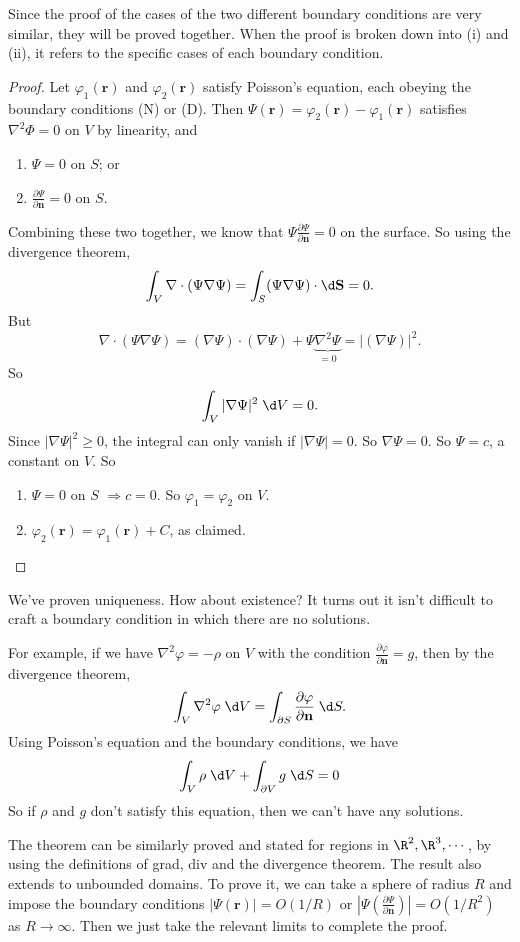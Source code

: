 \documentclass[a4paper]{article}
\begin{document}
Since the proof of the cases of the two different boundary conditions are very similar, they will be proved together. When the proof is broken down into (i) and (ii), it refers to the specific cases of each boundary condition.
\begin{proof}
  Let $\varphi_1(\mathbf{r})$ and $\varphi_2(\mathbf{r})$ satisfy Poisson's equation, each obeying the boundary conditions (N) or (D). Then $\Psi(\mathbf{r}) = \varphi_2(\mathbf{r}) - \varphi_1(\mathbf{r})$ satisfies $\nabla^2\Phi = 0$ on $V$ by linearity, and
  \begin{enumerate}
    \item $\Psi = 0$ on $S$; or
    \item $\frac{\partial \Psi}{\partial \mathbf{n}} = 0$ on $S$.
  \end{enumerate}
  Combining these two together, we know that $\Psi\frac{\partial \Psi}{\partial \mathbf{n}} = 0$ on the surface. So using the divergence theorem,
  \[
    \int_V \nabla\cdot (\Psi\nabla \Psi) = \int_S (\Psi\nabla\Psi)\cdot \d \mathbf{S} = 0.
  \]
  But
  \[
    \nabla\cdot(\Psi\nabla \Psi) = (\nabla\Psi)\cdot (\nabla\Psi) + \Psi\underbrace{\nabla^2\Psi}_{=0} = |(\nabla\Psi)|^2.
  \]
  So
  \[
    \int_V |\nabla \Psi|^2\;\d V = 0.
  \]
  Since $|\nabla\Psi|^2 \geq 0$, the integral can only vanish if $|\nabla \Psi| = 0$. So $\nabla\Psi = 0$. So $\Psi = c$, a constant on $V$. So
  \begin{enumerate}
    \item $\Psi = 0$ on $S$ $\Rightarrow c = 0$. So $\varphi_1 = \varphi_2$ on $V$.
    \item $\varphi_2(\mathbf{r}) = \varphi_1(\mathbf{r}) + C$, as claimed.
  \end{enumerate}
\end{proof}
We've proven uniqueness. How about existence? It turns out it isn't difficult to craft a boundary condition in which there are no solutions.

For example, if we have $\nabla^2 \varphi = -\rho$ on $V$ with the condition $\frac{\partial \varphi}{\partial \mathbf{n}} = g$, then by the divergence theorem,
\[
  \int_V \nabla^2\varphi \;\d V = \int_{\partial S} \frac{\partial \varphi}{\partial \mathbf{n}}\;\d S.
\]
Using Poisson's equation and the boundary conditions, we have
\[
  \int_V \rho \;\d V + \int_{\partial V} g\;\d S = 0
\]
So if $\rho$ and $g$ don't satisfy this equation, then we can't have any solutions.

The theorem can be similarly proved and stated for regions in $\R^2, \R^3, \cdots$, by using the definitions of grad, div and the divergence theorem. The result also extends to unbounded domains. To prove it, we can take a sphere of radius $R$ and impose the boundary conditions $|\Psi(\mathbf{r})| = O(1/R)$ or $|\Psi(\frac{\partial \Psi}{\partial \mathbf{n}})| = O(1/R^2)$ as $R\to \infty$. Then we just take the relevant limits to complete the proof.
\end{document}
